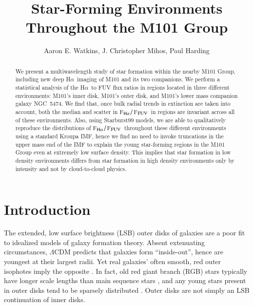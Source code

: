 \documentclass[iop]{emulateapj}
\newcommand{\ha}{H$\alpha$}
\newcommand{\hafuv}{F$_{\rm H\alpha}/$F$_{\rm FUV}$}
\begin{document}
\title{Star-Forming Environments Throughout the M101 Group}

\author{Aaron E. Watkins, 
  J. Christopher Mihos,
  Paul Harding
  }


\begin{abstract}

We present a multiwavelength study of star formation within the nearby
M101 Group, including new deep \ha \ imaging of M101 and its two
companions.  We perform a statistical analysis of the \ha \ to FUV
flux ratios in  regions located in three different
environments: M101's inner disk, M101's outer disk, and M101's lower
mass companion galaxy NGC~5474.  We find that, once bulk radial trends
in extinction are taken into account, both the median and scatter in
\hafuv \ in  regions are invariant across all of these
environments.  Also, using Starburst99 models, we are able to
qualitatively reproduce the distributions of \hafuv \ throughout these
different environments using a standard Kroupa IMF, hence we find no
need to invoke truncations in the upper mass end of the IMF to explain
the young star-forming regions in the M101 Group even at extremely low
surface density.  This implies that star formation in low density
environments differs from star formation in high density environments
only by intensity and not by cloud-to-cloud physics.

\end{abstract}


\newpage

\section{Introduction}
The extended, low surface brightness (LSB) outer disks of galaxies are
a poor fit to idealized models of galaxy formation theory.  Absent
extenuating circumstances, $\Lambda$CDM predicts that galaxies form
``inside-out'', hence are youngest at their largest radii.  Yet real
galaxies' often smooth, red outer isophotes imply the opposite
\citep[e.g.][]{bakos08, zheng15, laine16}.  In fact, old red giant
branch (RGB) stars typically have longer scale lengths than main
sequence stars \citep[e.g.][]{davidge03, vlajic09, vlajic11}, and any
young stars present in outer disks tend to be sparsely distributed
\citep[e.g.][]{barker07, davidge10}.  Outer disks are not simply an
LSB continuation of inner disks.
\end{document}
